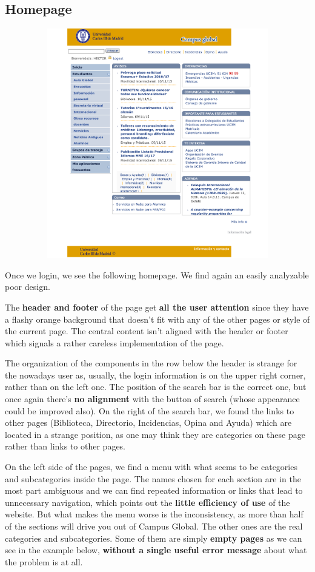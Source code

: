 \documentclass{article}
\begin{document}
\subsection{Homepage}
\vspace{0.3cm}
\begin{center}
\includegraphics[width=15cm, height=10cm, keepaspectratio]{campus}
\end{center}


Once we login, we see the following homepage. We find again an easily analyzable poor design. 

The \textbf{header and footer} of the page get \textbf{all the user attention} since they have a flashy orange background that doesn’t fit with any of the other pages or style of the current page.  
The central content isn’t aligned with the header or footer which signals a rather careless implementation of the page. 

The organization of the components in the row below the header is strange for the nowadays user as, usually, the login information is on the upper right corner, rather than on the left one. The position of the search bar is the correct one, but once again there’s \textbf{no alignment} with the button of search (whose appearance could be improved also).  On the right of the search bar, we found the links to other pages (Biblioteca, Directorio, Incidencias, Opina and Ayuda) which are located in a strange position, as one may think they are categories on these page rather than links to other pages. 

On the left side of the pages, we find a menu with what seems to be categories and subcategories inside the page. The names chosen for each section are in the most part ambiguous and we can find repeated information or links that lead to unnecessary navigation, which points out the \textbf{little efficiency of use} of the website. But what makes the menu worse is the inconsistency, as more than half of the sections will drive you out of Campus Global. The other ones are the real categories and subcategories. Some of them are simply \textbf{empty pages} as we can see in the example below, \textbf{without a single useful error message} about what the problem is at all.
\end{document}
